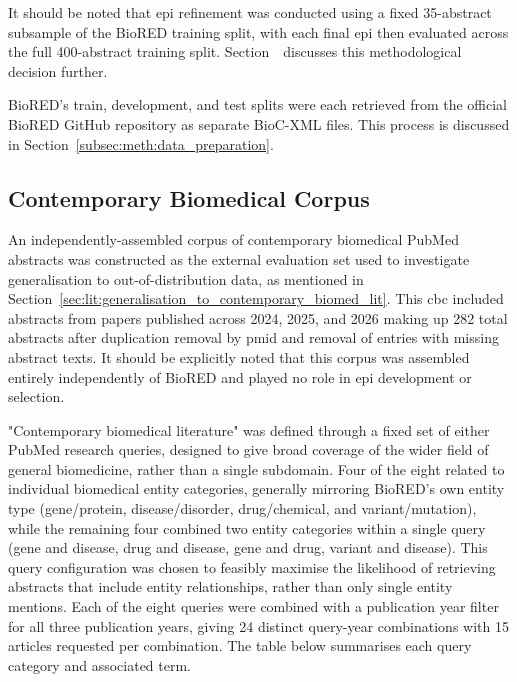 It should be noted that \gls{epi} refinement was conducted using a fixed 35-abstract subsample of the BioRED training split, with each final \gls{epi} then evaluated across the full 400-abstract training split. Section~\pref \ discusses this methodological decision further.

BioRED's train, development, and test splits were each retrieved from the official BioRED GitHub repository as separate BioC-XML files. This process is discussed in Section~\ref{subsec:meth:data_preparation}.

\subsection{Contemporary Biomedical Corpus}
\label{subsec:meth:contemporary_biomedical_corpus}
An independently-assembled corpus of contemporary biomedical PubMed abstracts was constructed as the external evaluation set used to investigate generalisation to out-of-distribution data, as mentioned in Section~\ref{sec:lit:generalisation_to_contemporary_biomed_lit}. This \gls{cbc} included abstracts from papers published across 2024, 2025, and 2026 making up 282 total abstracts after duplication removal by \gls{pmid} and removal of entries with missing abstract texts. It should be explicitly noted that this corpus was assembled entirely independently of BioRED and played no role in \gls{epi} development or selection.

"Contemporary biomedical literature" was defined through a fixed set of either PubMed research queries, designed to give broad coverage of the wider field of general biomedicine, rather than a single subdomain. Four of the eight related to individual biomedical entity categories, generally mirroring BioRED's own entity type (gene/protein, disease/disorder, drug/chemical, and variant/mutation), while the remaining four combined two entity categories within a single query (gene and disease, drug and disease, gene and drug, variant and disease). This query configuration was chosen to feasibly maximise the likelihood of retrieving abstracts that include entity relationships, rather than only single entity mentions. Each of the eight queries were combined with a publication year filter for all three publication years, giving 24 distinct query-year combinations with 15 articles requested per combination. The table below summarises each query category and associated term.

